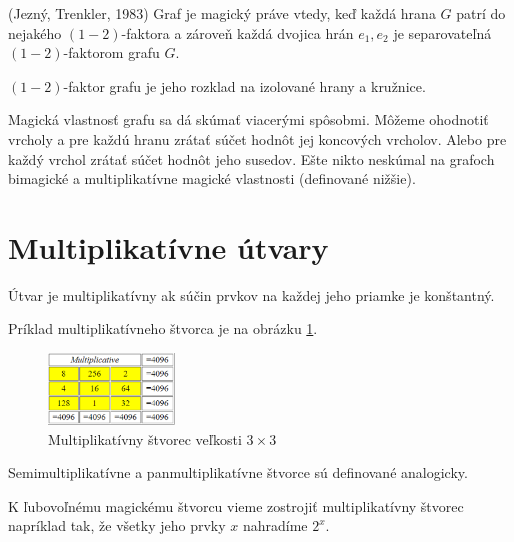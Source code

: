 \begin{subtheorem} (Jezný, Trenkler, 1983) Graf je magický práve vtedy, keď každá hrana $G$ patrí do nejakého $(1-2)$-faktora a zároveň každá dvojica hrán $e_1, e_2$ je separovateľná $(1-2)$-faktorom grafu $G$.
\end{subtheorem}

\begin{subnote} $(1-2)$-faktor grafu je jeho rozklad na izolované hrany a kružnice.
\end{subnote} 

Magická vlastnosť grafu sa dá skúmať viacerými spôsobmi. Môžeme ohodnotiť vrcholy a pre každú hranu zrátať súčet hodnôt jej koncových vrcholov. Alebo pre každý vrchol zrátať súčet hodnôt jeho susedov. Ešte nikto neskúmal na grafoch bimagické a multiplikatívne magické vlastnosti (definované nižšie). \\



\section{Multiplikatívne útvary}
\begin{definition} Útvar je multiplikatívny ak súčin prvkov na každej jeho priamke je konštantný.
\end{definition}

Príklad multiplikatívneho štvorca je na obrázku \ref{obr:fig_basic_mult_3x3}.

\begin{figure}[H]
\centerline{\includegraphics[width=0.3\textwidth]{images/basic_mult_3x3}}
\caption[Multiplikatívny štvorec veľkosti $3 \times 3$]{Multiplikatívny štvorec veľkosti $3 \times 3$ \cite{multimagie}}
\label{obr:fig_basic_mult_3x3}
\end{figure}

\begin{note} Semimultiplikatívne a panmultiplikatívne štvorce sú definované analogicky.
\end{note}

K ľubovoľnému magickému štvorcu vieme zostrojiť multiplikatívny štvorec napríklad tak, že všetky jeho prvky $x$ nahradíme $2^x$. \\


